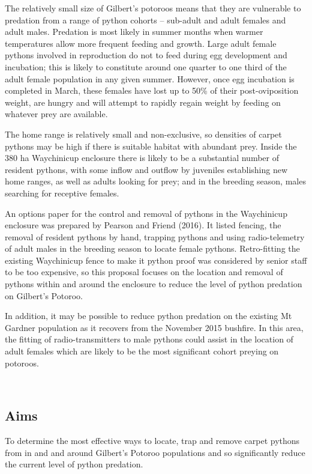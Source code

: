 \documentclass[version=last,
    paper=a4,                               %
    10pt,                                   %
    dvipsnames,
    oneside,                              %
    headings=openany,                       %
    open=any,
    BCOR=7mm,                               %
    DIV=15,     %
]{scrbook}
\begin{document}
The relatively small size of Gilbert's potoroos means that they are
vulnerable to predation from a range of python cohorts -- sub-adult and
adult females and adult males. Predation is most likely in summer months
when warmer temperatures allow more frequent feeding and growth. Large
adult female pythons involved in reproduction do not to feed during egg
development and incubation; this is likely to constitute around one
quarter to one third of the adult female population in any given summer.
However, once egg incubation is completed in March, these females have
lost up to 50\% of their post-oviposition weight, are hungry and will
attempt to rapidly regain weight by feeding on whatever prey are
available.

The home range is relatively small and non-exclusive, so densities of
carpet pythons may be high if there is suitable habitat with abundant
prey. Inside the 380 ha Waychinicup enclosure there is likely to be a
substantial number of resident pythons, with some inflow and outflow by
juveniles establishing new home ranges, as well as adults looking for
prey; and in the breeding season, males searching for receptive females.

An options paper for the control and removal of pythons in the
Waychinicup enclosure was prepared by Pearson and Friend (2016). It
listed fencing, the removal of resident pythons by hand, trapping
pythons and using radio-telemetry of adult males in the breeding season
to locate female pythons. Retro-fitting the existing Waychinicup fence
to make it python proof was considered by senior staff to be too
expensive, so this proposal focuses on the location and removal of
pythons within and around the enclosure to reduce the level of python
predation on Gilbert's Potoroo.

In addition, it may be possible to reduce python predation on the
existing Mt Gardner population as it recovers from the November 2015
bushfire. In this area, the fitting of radio-transmitters to male
pythons could assist in the location of adult females which are likely
to be the most significant cohort preying on potoroos.

~




\subsection*{Aims}

To determine the most effective ways to locate, trap and remove carpet
pythons from in and and around Gilbert's Potoroo populations and so
significantly reduce the current level of python predation.
\end{document}
